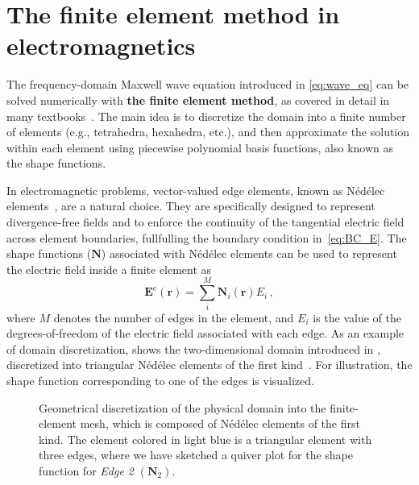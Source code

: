 
    \section{The finite element method in electromagnetics}\label{sec:fem}
 The frequency-domain Maxwell wave equation introduced in \eqref{eq:wave_eq} can be solved numerically with \textbf{the finite element method}, as covered in detail 
 in many textbooks~\cite{jin, fem_book}. The main idea is to discretize the domain into a finite number of elements (e.g., tetrahedra, hexahedra, etc.), and then approximate the solution
 within each element using piecewise polynomial basis functions, also known as the shape functions. 
 
 In electromagnetic problems, vector-valued edge elements, known as Nédélec elements~\cite{nedelec}, 
 are a natural choice. They are specifically designed to represent divergence-free fields and 
 to enforce the continuity of the tangential electric field across element boundaries, fullfulling the boundary condition in~\eqref{eq:BC_E}.
 The shape functions ($\mathbf{N}$) associated with Nédélec elements can be used to represent the electric field inside a finite element as
    \begin{equation}\label{eq:ned_shape}
 \boldsymbol{E}^e(\mathbf{r})=\sum^M_i \boldsymbol{N}_i(\mathbf{r}) E_i\,,
    \end{equation}
 where $M$ denotes the number of edges in the element, and $E_i$ is the value of the degrees-of-freedom of the electric field associated with each edge. As an example
  of domain discretization,  shows the two-dimensional domain introduced in , discretized
   into triangular Nédélec elements of the first kind~\cite{nedelec}. For illustration, the shape function corresponding to one of the edges is visualized.

    \begin{figure}[tb]
        \centering

        \caption{Geometrical discretization of the physical domain into the finite-element mesh, which is composed of Nédélec elements of the first kind. The element colored
 in light blue is a triangular element with three edges, where
 we have sketched a quiver plot for the shape function for \textit{Edge
 2} $(\mathbf{N}_2)$.}
        \label{fig:fem}
    \end{figure}
    
